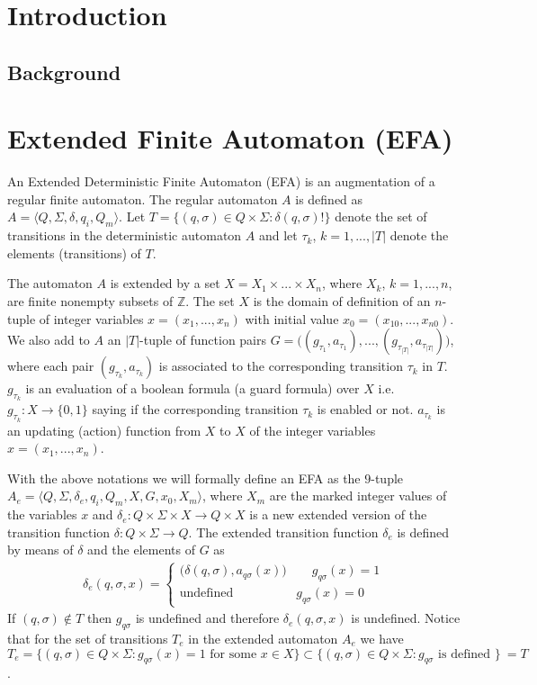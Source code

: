 \documentclass{article}
\begin{document}
\tableofcontents
\section{Introduction}

\subsection{Background}
\newpage
\section{Extended Finite Automaton (EFA)}
An Extended Deterministic Finite Automaton (EFA) is an
augmentation of a regular finite automaton. The regular automaton
$A$ is defined as $A=\langle Q,\Sigma,\delta, q_i,Q_m \rangle$.
Let $T=\{(q,\sigma)\in Q \times \Sigma: \delta(q,\sigma)!\}$
denote the set of transitions in the deterministic automaton $A$
and let $\tau_k$, $k=1,...,|T|$ denote the elements (transitions)
of $T$.

The automaton $A$ is extended by a set $X=X_1\times ... \times
X_n$, where $X_k$, $k=1,...,n$, are finite nonempty subsets of
$\mathbb{Z}$. The set $X$ is the domain of definition of an
$n$-tuple of integer variables $x=(x_1,...,x_n)$ with initial
value $x_0=(x_{10},...,x_{n0})$. We also add to $A$ an $|T|$-tuple
of function pairs $G=\big((g_{\tau_1},a_{\tau_1}),...,
(g_{\tau_{|T|}},a_{\tau_{|T|}})\big)$, where each pair
$(g_{\tau_k},a_{\tau_k})$ is associated to the corresponding
transition $\tau_k$ in $T$. $g_{\tau_k}$ is an evaluation of a
boolean formula (a guard formula) over $X$ i.e. $g_{\tau_k}:X
\rightarrow \{0,1\}$ saying if the corresponding transition
$\tau_k$ is enabled or not. $a_{\tau_k}$ is an updating (action)
function from $X$ to $X$ of the integer variables
$x=(x_1,...,x_n)$.

With the above notations we will formally define an EFA as the
$9$-tuple $A_{e}=\langle Q, \Sigma, \delta_{e}, q_i, Q_m, X, G
,x_0, X_m \rangle$, where $X_m$ are the marked integer values of
the variables $x$ and $\delta_{e}: Q \times \Sigma \times X
\rightarrow Q\times X $ is a new extended version of the
transition function $\delta:Q \times \Sigma \rightarrow Q$. The
extended transition function $\delta_e$ is defined by means of
$\delta$ and the elements of $G$ as
\begin{eqnarray}
\delta_{e}(q,\sigma,x)=\left\{
\begin{array}{ll}
(\delta(q,\sigma),a_{q \sigma}(x)\big)\quad\quad g_{q \sigma}(x)=1\\
\textrm{undefined} \quad\quad\quad\quad\quad g_{q \sigma}(x)=0
\end{array}\right.
\end{eqnarray}
If $(q,\sigma)\notin T$ then $g_{q\sigma}$ is undefined and
therefore $\delta_{e}(q,\sigma,x)$ is undefined. Notice that for
the set of transitions $T_e$ in the extended automaton $A_e$ we
have $T_e=\{(q,\sigma)\in Q \times \Sigma: g_{q\sigma}(x)=1
\textrm{ for some } x\in X\}\subset \{(q,\sigma)\in Q \times
\Sigma: g_{q\sigma} \textrm{ is defined } \}\ =T$.
\end{document}
